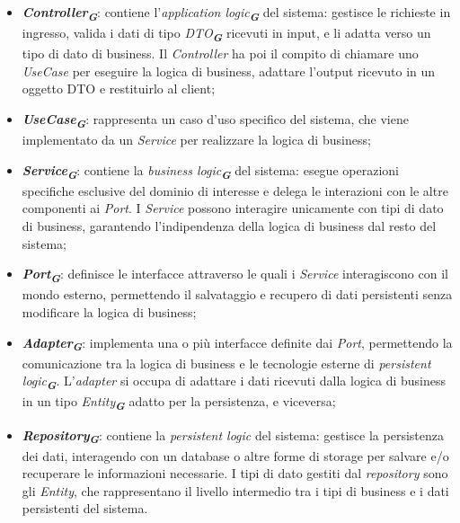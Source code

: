 \begin{itemize}
    \item \textbf{\emph{Controller}}\textsubscript{\textbf{\textit{G}}}: contiene l'\emph{application logic}\textsubscript{\textbf{\textit{G}}} del sistema: gestisce le richieste in ingresso, valida i dati di tipo \emph{DTO}\textsubscript{\textbf{\textit{G}}} ricevuti in input, e li adatta verso un tipo di dato di business. Il \emph{Controller} ha poi il compito di chiamare uno \emph{UseCase} per eseguire la logica di business, adattare l'output ricevuto in un oggetto DTO e restituirlo al client;
    \item \textbf{\emph{UseCase}}\textsubscript{\textbf{\textit{G}}}: rappresenta un caso d'uso specifico del sistema, che viene implementato da un \emph{Service} per realizzare la logica di business;
    \item \textbf{\emph{Service}}\textsubscript{\textbf{\textit{G}}}: contiene la \emph{business logic}\textsubscript{\textbf{\textit{G}}} del sistema: esegue operazioni specifiche esclusive del dominio di interesse e delega le interazioni con le altre componenti ai \emph{Port}. I \emph{Service} possono interagire unicamente con tipi di dato di business, garantendo l'indipendenza della logica di business dal resto del sistema;
    \item \textbf{\emph{Port}}\textsubscript{\textbf{\textit{G}}}: definisce le interfacce attraverso le quali i \emph{Service} interagiscono con il mondo esterno, permettendo il salvataggio e recupero di dati persistenti senza modificare la logica di business;
    \item \textbf{\emph{Adapter}}\textsubscript{\textbf{\textit{G}}}: implementa una o più interfacce definite dai \emph{Port}, permettendo la comunicazione tra la logica di business e le tecnologie esterne di \emph{persistent logic}\textsubscript{\textbf{\textit{G}}}. L'\emph{adapter} si occupa di adattare i dati ricevuti dalla logica di business in un tipo \emph{Entity}\textsubscript{\textbf{\textit{G}}} adatto per la persistenza, e viceversa;
    \item \textbf{\emph{Repository}}\textsubscript{\textbf{\textit{G}}}: contiene la \emph{persistent logic} del sistema: gestisce la persistenza dei dati, interagendo con un database o altre forme di storage per salvare e/o recuperare le informazioni necessarie. I tipi di dato gestiti dal \emph{repository} sono gli \emph{Entity}, che rappresentano il livello intermedio tra i tipi di business e i dati persistenti del sistema.
\end{itemize}


